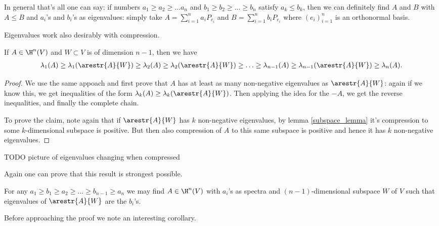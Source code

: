 In general that's all one can say: if numbers $a_{1} \geq a_{2} \geq \ldots a_{n}$ and $b_{1} \geq b_{2} \geq \ldots \geq b_{n}$ satisfy $a_{k} \leq b_{k}$, then we can definitely find $A$ and $B$ with $A \leq B$ and $a_{i}$'s and $b_{i}$'s as eigenvalues: simply take $A = \sum_{i = 1}^{n} a_{i} P_{e_{i}}$ and $B = \sum_{i = 1}^{n} b_{i} P_{e_{i}}$ where $(e_{i})_{i = 1}^{n}$ is an orthonormal basis.

Eigenvalues work also desirably with compression.

\begin{prop}\label{compression_eigenvalues}
	If $A \in \H^{n}(V)$ and $W \subset V$ is of dimension $n - 1$, then we have
	\begin{align*}
		\lambda_{1}(A) \geq \lambda_{1}(\arestr{A}{W}) \geq \lambda_{2}(A) \geq \lambda_{2}(\arestr{A}{W}) \geq \ldots \geq \lambda_{n - 1}(A) \geq \lambda_{n - 1}(\arestr{A}{W}) \geq \lambda_{n}(A).
	\end{align*}
\end{prop}

\begin{proof}
	We use the same appoach and first prove that $A$ has at least as many non-negative eigenvalues as $\arestr{A}{W}$: again if we know this, we get inequalities of the form $\lambda_{k}(A) \geq \lambda_{k}(\arestr{A}{W})$. Then applying the idea for the $-A$, we get the reverse inequalities, and finally the complete chain.

	To prove the claim, note again that if $\arestr{A}{W}$ has $k$ non-negative eigenvalues, by lemma \ref{subspace_lemma} it's compression to some $k$-dimensional subspace is positive. But then also compression of $A$ to this same subspace is positive and hence it has $k$ non-negative eigenvalues.
\end{proof}

TODO picture of eigenvalues changing when compressed

Again one can prove that this result is strongest possible.

\begin{prop}\label{compression_eigenvalues_con}
	For any $a_{1} \geq b_{1} \geq a_{2} \geq \ldots \geq b_{n - 1} \geq a_{n}$ we may find $A \in \H^{n}(V)$ with $a_{i}$'s as spectra and $(n - 1)$-dimensional subspace $W$ of $V$ such that eigenvalues of $\arestr{A}{W}$ are the $b_{i}$'s.
\end{prop}

Before approaching the proof we note an interesting corollary.

